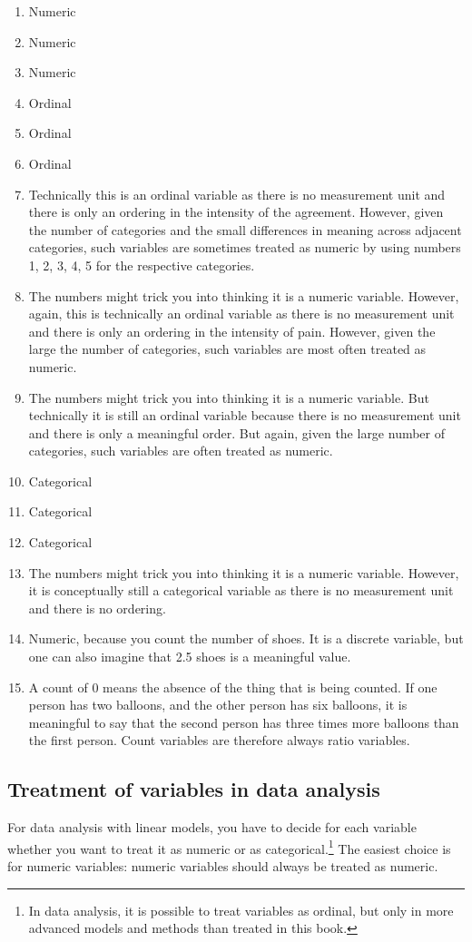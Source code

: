 \begin{enumerate}
\item Numeric
\item Numeric
\item Numeric
\item Ordinal
\item Ordinal
\item Ordinal
\item Technically this is an ordinal variable as there is no measurement unit and there is only an ordering in the intensity of the agreement. However, given the number of categories and the small differences in meaning across adjacent categories, such variables are sometimes treated as numeric by using numbers 1, 2, 3, 4, 5 for the respective categories.
\item The numbers might trick you into thinking it is a numeric variable. However, again, this is technically an ordinal variable as there is no measurement unit and there is only an ordering in the intensity of pain. However, given the large the number of categories, such variables are most often treated as numeric.
\item The numbers might trick you into thinking it is a numeric variable. But technically it is still an ordinal variable because there is no measurement unit and there is only a meaningful order. But again, given the large number of categories, such variables are often treated as numeric.
\item Categorical
\item Categorical
\item Categorical
\item The numbers might trick you into thinking it is a numeric variable. However, it is conceptually still a categorical variable as there is no measurement unit and there is no ordering.
\item Numeric, because you count the number of shoes. It is a discrete variable, but one can also imagine that 2.5 shoes is a meaningful value.
\item A count of 0 means the absence of the thing that is being counted. If one person has two balloons, and the other person has six balloons, it is meaningful to say that the second person has three times more balloons than the first person. Count variables are therefore always ratio variables.
\end{enumerate}



\subsection{Treatment of variables in data analysis}
For data analysis with linear models, you have to decide for each variable whether you want to treat it as numeric or as categorical.\footnote{In data analysis, it is possible to treat variables as ordinal, but only in more advanced models and methods than treated in this book.} The easiest choice is for numeric variables: numeric variables should always be treated as numeric.


